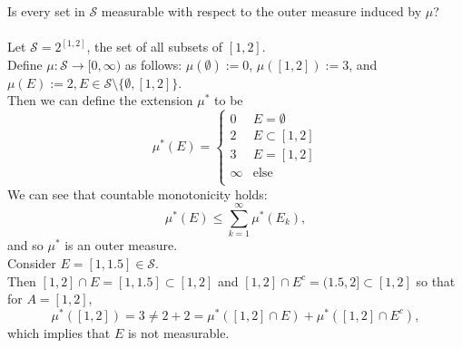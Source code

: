 \begin{enumerate}
	Is every set in $\mathcal{S}$ measurable with respect to the outer measure induced by $\mu$?\\
	\\Let $\mathcal{S}=2^{[1,2]}$, the set of all subsets of $[1,2]$.
	\\Define $\mu:\mathcal{S}\to[0,\infty)$ as follows: $\mu(\emptyset):=0$, $\mu([1,2]):=3$, and $\mu(E):=2,E\in\mathcal{S}\setminus\{\emptyset,[1,2]\}$. 
	\\Then we can define the extension $\mu^*$ to be
	\[
		\mu^*(E)=
		\begin{cases}
			0&E=\emptyset\\
			2&E\subset[1,2]\\
			3&E=[1,2]\\
			\infty&\text{else}\\
		\end{cases}
	\]
	We can see that countable monotonicity holds:
	\[
		\mu^*(E)\le\sum_{k=1}^\infty\mu^*(E_k),
	\]
	and so $\mu^*$ is an outer measure.
	\\Consider $E=[1,1.5]\in\mathcal{S}$.
	\\Then $[1,2]\cap E=[1,1.5]\subset[1,2]$ and $[1,2]\cap E^c=(1.5,2]\subset[1,2]$ so that for $A=[1,2]$,
	\[
		\mu^*([1,2])=3\neq2+2=\mu^*([1,2]\cap E)+\mu^*([1,2]\cap E^c),
	\]
	which implies that $E$ is not measurable.
\end{enumerate}

